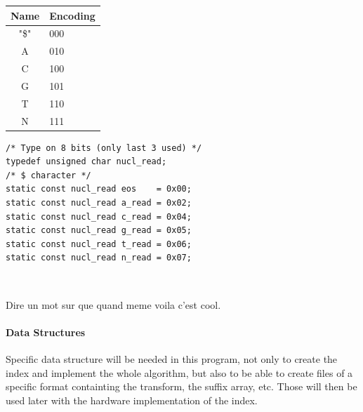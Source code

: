 \begin{minipage}[c]{0.35\textwidth}
\vspace*{6mm}
	\begin{tabular}{|c|l|}
	\hline
		Name & Encoding \\
		\hline 
		"\$" & 000 \\
		A & 010 \\
		C & 100 \\
		G & 101 \\
		T & 110 \\
		N & 111 \\
    \hline
	\end{tabular}
\end{minipage}
\begin{minipage}[t]{0.85\textwidth}
\vspace*{-30mm}
    \begin{verbatim}
/* Type on 8 bits (only last 3 used) */
typedef unsigned char nucl_read; 
/* $ character */
static const nucl_read eos    = 0x00;	
static const nucl_read a_read = 0x02;
static const nucl_read c_read = 0x04;
static const nucl_read g_read = 0x05;
static const nucl_read t_read = 0x06;
static const nucl_read n_read = 0x07;
    \end{verbatim}
\begin{lstlisting}


\end{lstlisting}
\end{minipage}
\vspace*{3mm}

Dire un mot sur que quand meme voila c'est cool.
	

\paragraph{Data Structures}

Specific data structure will be needed in this program, not only to create the index and implement the whole algorithm, but also to be able to create files of a specific format containting the transform, the suffix array, etc. Those will then be used later with the hardware implementation of the index.

